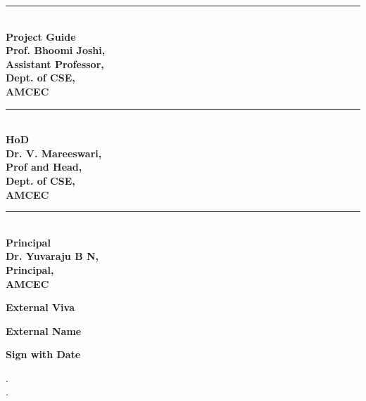 \documentclass[a4paper, 12pt]{report}
\begin{document}
\vspace{1.5cm}
\noindent
\begin{minipage}[t]{0.32\textwidth}
    \singlespacing
    \centering
    \rule{0.8\linewidth}{0.4pt}\\
    \textbf{Project Guide\\Prof. Bhoomi Joshi,\\Assistant Professor,\\Dept. of CSE,\\AMCEC}
\end{minipage}
\hfill
\begin{minipage}[t]{0.32\textwidth}
    \singlespacing
    \centering
    \rule{0.8\linewidth}{0.4pt}\\
    \textbf{HoD\\Dr. V. Mareeswari,\\Prof and Head,\\Dept. of CSE,\\AMCEC}
\end{minipage}
\hfill
\begin{minipage}[t]{0.32\textwidth}
    \singlespacing
    \centering
    \rule{0.8\linewidth}{0.4pt}\\
    \textbf{Principal\\Dr. Yuvaraju B N,\\Principal,\\AMCEC}
\end{minipage}

\vspace{0.8cm}

\begin{center}
    {\textbf{External Viva}}
\end{center}

\begin{minipage}[t]{0.32\textwidth}
    \centering  
    \textbf{External Name}
\end{minipage}
\hfill
\begin{minipage}[t]{0.32\textwidth}
    \centering 
    \textbf{Sign with Date}
\end{minipage}
\vspace{0.5cm}

.\\
.

\titlespacing*{\chapter}{0pt}{20pt}{10pt}
\setlength{\parindent}{0pt}
\doublespacing
\end{document}
